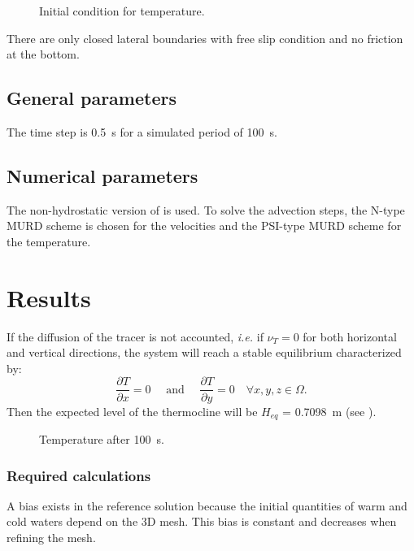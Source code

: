 \begin{figure}[H]
 \centering
  \caption{Initial condition for temperature.}\label{fig:bump_static:temp_ic:section}
\end{figure}

%
%
There are only closed lateral boundaries with free slip condition and no
friction at the bottom.
%
\subsection{General parameters}
%
The time step is 0.5~s for a simulated period of 100~s.
%
\subsection{Numerical parameters}
%
The non-hydrostatic version of  is used.
To solve the advection steps, the N-type MURD scheme is chosen for the
velocities and the PSI-type MURD scheme for the temperature.
%
%
\section{Results}
%
If the diffusion of the tracer is not accounted, \emph{i.e.} if $\nu_{T} = 0$
for both horizontal and vertical directions, the system will reach a stable
equilibrium characterized by:
\begin{equation}
 \frac{\partial T}{\partial x} = 0 \quad \textrm{ and } \quad \frac{\partial T}{\partial y} = 0 \quad \forall x, y , z \in \Omega.
\end{equation}
Then the expected level of the thermocline will be $H_{eq}$ = 0.7098~m (see
\cite{Abbas2015}).

\begin{figure}[H]
 \centering
  \caption{Temperature after 100~s.}\label{fig:bump_static:temp:section}
\end{figure}

%
\subsubsection{Required calculations}
A bias exists in the reference solution because the initial quantities of warm
and cold waters depend on the 3D mesh. This bias is constant and decreases when
refining the mesh.

